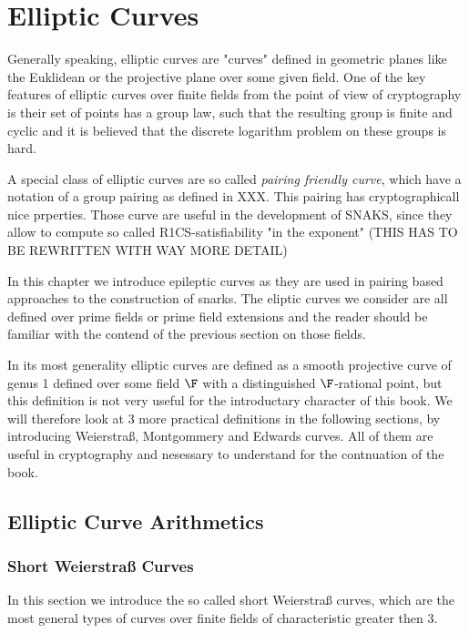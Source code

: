 \chapter{Elliptic Curves}
Generally speaking, elliptic curves are "curves" defined in geometric planes like the Euklidean or the projective plane over some given field. One of the key features of elliptic curves over finite fields from the point of view of cryptography is their set of points has a group law, such that the resulting group is finite and cyclic and it is believed that the discrete logarithm problem on these groups is hard. 

A special class of elliptic curves are so called \textit{pairing friendly curve}, which have a notation of a group pairing as defined in XXX. This pairing has cryptographicall nice prperties. Those curve are useful in the development of SNAKS, since they allow to compute so called R1CS-satisfiability "in the exponent" (THIS HAS TO BE REWRITTEN WITH WAY MORE DETAIL)

In this chapter we introduce epileptic curves as they are used in pairing based approaches to the construction of snarks. The eliptic curves we consider are all defined over prime fields or prime field extensions and the reader should be familiar with the contend of the previous section on those fields.

In its most generality elliptic curves are defined as a smooth projective curve of genus 1 defined over some field $\F$ with a distinguished $\F$-rational point, but this definition is not very useful for the introductary character of this book. We will therefore look at $3$ more practical definitions in the following sections, by introducing Weierstraß, Montgommery and Edwards curves. All of them are useful in cryptography and nesessary to understand for the contnuation of the book.

\section{Elliptic Curve Arithmetics}

\subsection{Short Weierstraß Curves}
In this section we introduce the so called short Weierstraß curves, which are the most general types of curves over finite fields of characteristic greater then $3$. 

